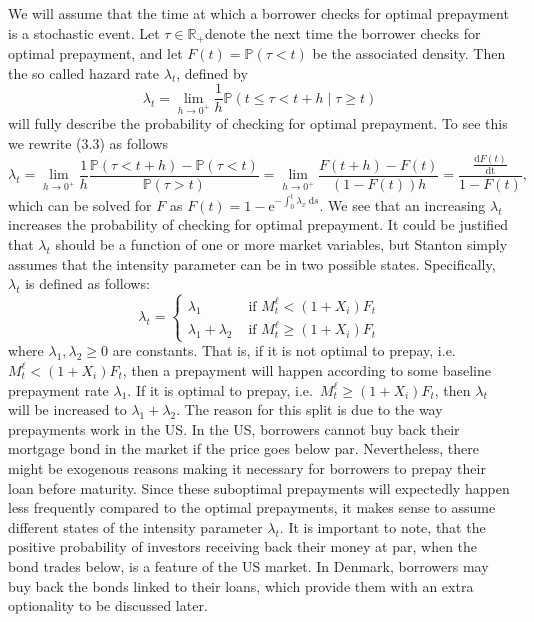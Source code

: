 \documentclass[12pt,twoside]{reedthesis}
\begin{document}
We will assume that the time at which a borrower checks for optimal prepayment is a stochastic event. Let \(\tau \in \mathbb{R}_{+}\)denote the next time the borrower checks for optimal prepayment, and let \(F(t)=\mathbb{P}(\tau<t)\) be the associated density. Then the so called hazard rate \(\lambda_{t}\), defined by
\[
\lambda_{t}=\lim _{h \rightarrow 0^{+}} \frac{1}{h} \mathbb{P}(t \leq \tau<t+h \mid \tau \geq t)
\]
will fully describe the probability of checking for optimal prepayment. To see this we rewrite (3.3) as follows
\[
\lambda_{t}=\lim _{h \rightarrow 0^{+}} \frac{1}{h} \frac{\mathbb{P}(\tau<t+h)-\mathbb{P}(\tau<t)}{\mathbb{P}(\tau>t)}=\lim _{h \rightarrow 0^{+}} \frac{F(t+h)-F(t)}{(1-F(t)) h}=\frac{\frac{\mathrm{d} F(t)}{\mathrm{dt}}}{1-F(t)},
\]
which can be solved for \(F\) as \(F(t)=1-\mathrm{e}^{-\int_{0}^{t} \lambda_{x} \mathrm{~d} s}\). We see that an increasing \(\lambda_{t}\) increases the probability of checking for optimal prepayment. It could be justified that \(\lambda_{t}\) should be a function of one or more market variables, but Stanton simply assumes that the intensity parameter can be in two possible states. Specifically, \(\lambda_{t}\) is defined as follows:
\[
\lambda_{t}= \begin{cases}\lambda_{1} & \text { if } M_{t}^{\ell}<\left(1+X_{i}\right) F_{t} \\ \lambda_{1}+\lambda_{2} & \text { if } M_{t}^{\ell} \geq\left(1+X_{i}\right) F_{t}\end{cases}
\]
where \(\lambda_{1}, \lambda_{2} \geq 0\) are constants. That is, if it is not optimal to prepay, i.e.~\(M_{t}^{\ell}<\left(1+X_{i}\right) F_{t}\), then a prepayment will happen according to some baseline prepayment rate \(\lambda_{1}\). If it is optimal to prepay, i.e.~\(M_{t}^{\ell} \geq\left(1+X_{i}\right) F_{t}\), then \(\lambda_{t}\) will be increased to \(\lambda_{1}+\lambda_{2}\). The reason for this split is due to the way prepayments work in the US. In the US, borrowers cannot buy back their mortgage bond in the market if the price goes below par. Nevertheless, there might be exogenous reasons making it necessary for borrowers to prepay their loan before maturity. Since these suboptimal prepayments will expectedly happen less frequently compared to the optimal prepayments, it makes sense to assume different states of the intensity parameter \(\lambda_{t}\). It is important to note, that the positive probability of investors receiving back their money at par, when the bond trades below, is a feature of the US market. In Denmark, borrowers may buy back the bonds linked to their loans, which provide them with an extra optionality to be discussed later.
\end{document}
